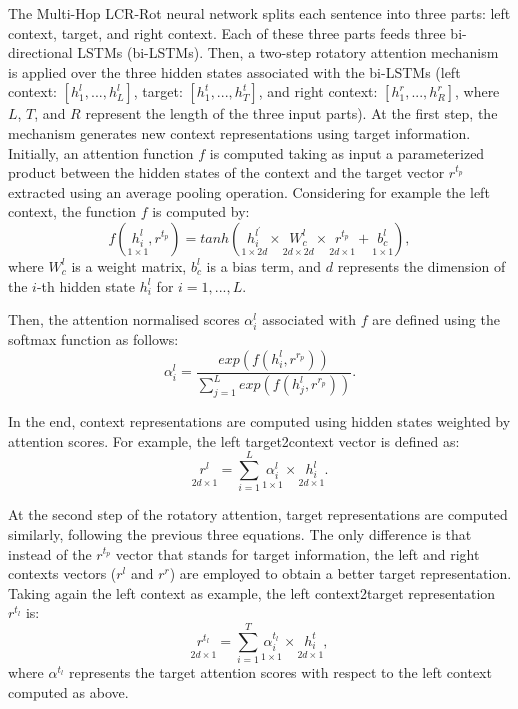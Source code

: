 \documentclass[hidelinks]{llncs}
\begin{document}
The Multi-Hop LCR-Rot neural network splits each sentence into three parts: left context, target, and right context. Each of these three parts feeds three bi-directional LSTMs (bi-LSTMs). Then, a two-step rotatory attention mechanism is applied over the three hidden states associated with the bi-LSTMs (left context: $[h_1^l, ..., h_L^l]$, target: $[h_1^t, ..., h_T^t]$, and right context: $[h_1^r, ..., h_R^r]$, where $L$, $T$, and $R$ represent the length of the three input parts). At the first step, the mechanism generates new context representations using target information. Initially, an attention function $f$ is computed taking as input a parameterized product between the hidden states of the context and the target vector $r^{t_p}$ extracted using an average pooling operation. Considering for example the left context, the function $f$ is computed by: 
\begin {equation}
\label{equation1}
f(\underset{1 \times 1}{h^l_i}, r^{t_p}) = tanh(\underset{1 \times 2d}{h^{l^'}_i} \times \underset{2d \times 2d}{W_c^l} \times \underset{2d \times 1}{r^{t_p}_{}} + \underset{1 \times 1}{b^l_c}),
\end {equation}
where $W_c^l$ is a weight matrix, $b_c^l$ is a bias term, and $d$ represents the dimension of the $i$-th hidden state $h^l_i$ for $i = 1, ..., L$.

Then, the attention normalised scores $\alpha_i^l$ associated with $f$ are defined using the softmax function as follows:
\begin {equation}
\label{equation2}
\alpha_i^l = \frac{exp(f(h_i^l, r^{r_p}))}{\sum_{j=1}^L exp(f(h_j^l, r^{r_p}))}.
\end {equation}

In the end, context representations are computed using hidden states weighted by attention scores. For example, the left target2context vector is defined as:
\begin {equation}
\label{equation3}
\underset{2d \times 1}{r^l_{}} = \sum_{i = 1}^{L}\underset{1 \times 1}{\alpha^l_i} \times \underset{2d \times 1}{h_i^l}.
\end {equation}

At the second step of the rotatory attention, target representations are computed similarly, following the previous three equations. The only difference is that instead of the $r^{t_p}$ vector that stands for target information, the left and right contexts vectors ($r^l$ and $r^r$) are employed to obtain a better target representation. Taking again the left context as example, the left context2target representation $r^{t_l}$ is:
\begin {equation}
\label{equation4}
\underset{2d \times 1}{r^{t_l}_{}} = \sum_{i = 1}^{T}\underset{1 \times 1}{\alpha_i^{t_l}} \times \underset{2d \times 1}{h_i^t},
\end {equation}
where $\alpha^{t_l}$ represents the target attention scores with respect to the left context computed as above.
\end{document}
